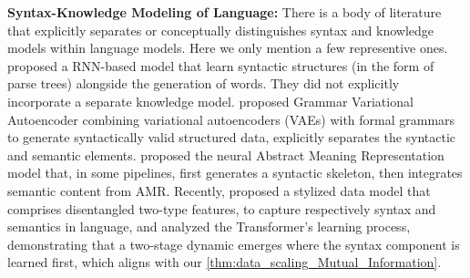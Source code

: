 \documentclass[11pt]{article}
\theoremstyle{plain}
\theoremstyle{definition}
\begin{document}
 

\vspace{0.1cm}
\noindent
{\bf Syntax-Knowledge Modeling of Language:}
There is a body of literature that
explicitly separates or conceptually distinguishes syntax and knowledge models within language models. Here we only mention a few representive ones. \citep{dyer-etal-2016-recurrent} proposed a RNN-based model that learn syntactic structures (in the form of parse trees) alongside the generation of words. They did not explicitly incorporate a separate knowledge model. 
\citep{kusner2017grammar} proposed
Grammar Variational Autoencoder combining variational autoencoders (VAEs) with formal grammars to generate syntactically valid structured data, explicitly separates the syntactic and semantic elements.
\citep{konstas2017neural}
proposed the neural Abstract Meaning Representation model that, in some pipelines, first generates a syntactic skeleton, then integrates semantic content from AMR.
Recently, \citep{gong2025disentangling} proposed a stylized data model that comprises disentangled two-type features, to capture respectively syntax and semantics in language, and analyzed the Transformer's learning process, demonstrating that a two-stage dynamic emerges where the syntax component is learned first, which aligns with our \cref{thm:data_scaling_Mutual_Information}.
\end{document}
